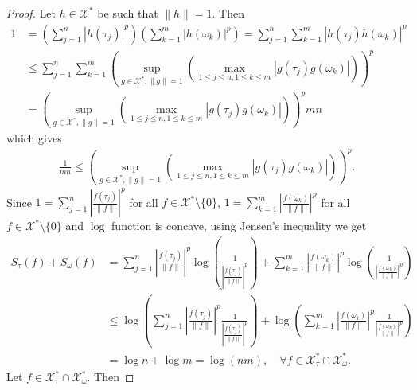 \documentclass{amsart}
\begin{document}
\begin{proof}
	Let $h \in \mathcal{X}^*$ be such that $\|h\|=1$. Then 
\begin{align*}
	1&=\left(\sum_{j=1}^n|h(\tau_j)|^p\right)\left(\sum_{k=1}^m|h(\omega_k)|^p\right)=\sum_{j=1}^n\sum_{k=1}^m
	|h(\tau_j)h(\omega_k)|^p\\
	&\leq \sum_{j=1}^n\sum_{k=1}^m\left(\displaystyle\sup_{g \in \mathcal{X}^*, \|g\|=1}\left(\max_{1\leq j\leq n, 1\leq k\leq m}|g(\tau_j)g(\omega_k)|\right)\right)^p\\
	&=\left(\displaystyle\sup_{g \in \mathcal{X}^*, \|g\|=1}\left(\max_{1\leq j\leq n, 1\leq k\leq m}|g(\tau_j)g(\omega_k)|\right)\right)^pmn
\end{align*}	
which gives 
\begin{align*}
	\frac{1}{mn}\leq \left(\displaystyle\sup_{g \in \mathcal{X}^*, \|g\|=1}\left(\max_{1\leq j\leq n, 1\leq k\leq m}|g(\tau_j)g(\omega_k)|\right)\right)^p.
\end{align*}
Since  $1=\sum_{j=1}^n\left|\frac{f(\tau_j)}{\|f\|}\right|^p$ for all  $f \in \mathcal{X}^* \setminus \{0\}$,  $1=\sum_{k=1}^m\left|\frac{f(\omega_k)}{\|f\|}\right|^p$ for all  $f\in  \mathcal{X}^*\setminus \{0\}$ and $\log$ function is concave, using Jensen's inequality  we get 
\begin{align*}
S_\tau (f)+S_\omega (f)&=\sum_{j=1}^{n}\left|\frac{f(\tau_j)}{\|f\|}\right|^p\log \left(\frac{1}{\left|\frac{f(\tau_j)}{\|f\|}\right|^p}\right)+\sum_{k=1}^{m}\left|\frac{f(\omega_k)}{\|f\|}\right|^p\log \left(\frac{1}{\left|\frac{f(\omega_k)}{\|f\|}\right|^p}\right)\\
&\leq \log \left(\sum_{j=1}^{n}\left|\frac{f(\tau_j)}{\|f\|}\right|^p\frac{1}{\left|\frac{f(\tau_j)}{\|f\|}\right|^p}\right)+\log \left(\sum_{k=1}^{m}\left|\frac{f(\omega_k)}{\|f\|}\right|^p\frac{1}{\left|\frac{f(\omega_k)}{\|f\|}\right|^p}\right)\\
&=\log n+\log m=\log (nm), \quad \forall f \in \mathcal{X}^*_\tau \cap \mathcal{X}^*_\omega.
\end{align*}
Let $f \in\mathcal{X}^*_\tau \cap \mathcal{X}^*_\omega$. Then 	


\end{proof}
\end{document}
